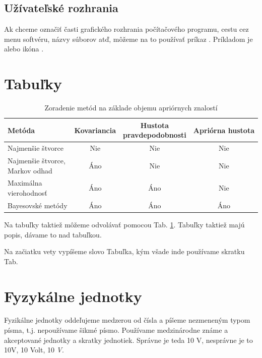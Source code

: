\subsection{Užívateľské rozhrania}

Ak chceme označiť časti grafického rozhrania počítačového programu, cestu cez menu softvéru, názvy súborov atď, môžeme na to používať príkaz . Príkladom je  alebo ikóna .

\section{Tabuľky}


\begin{table}[htb]
\centering
\caption{Zoradenie metód na základe objemu apriórnych znalostí}
\begin{tabular}{ |l|c|c|c| }
  \hline
  \parbox[c]{3.5cm}{Metóda} & Kovariancia & \parbox[c]{3cm}{Hustota\\pravdepodobnosti}& Apriórna hustota\\ [0.2cm] \hline
  \parbox[c]{3.5cm}{Najmenšie štvorce} & Nie & Nie & Nie \\ [0.2cm] \hline
  \parbox[c]{3.5cm}{Najmenšie štvorce,\\Markov odhad}& Áno & Nie & Nie \\ [0.2cm]   \hline
  \parbox[c]{3.5cm}{Maximálna\\vierohodnosť}& Áno & Áno & Nie \\ [0.2cm] \hline
  \parbox[c]{3.5cm}{Bayesovské metódy} & Áno & Áno & Áno \\ [0.2cm] \hline
\end{tabular}
    \label{TABULKA_3_1}
\end{table}

Na tabuľky taktiež môžeme odvolávať pomocou Tab. \ref{TABULKA_3_1}. Tabuľky taktiež majú popis, dávame to nad tabuľkou.

Na začiatku vety vypíšeme slovo Tabuľka, kým všade inde používame skratku Tab.

\section{Fyzykálne jednotky}

Fyzikálne jednotky oddeľujeme medzerou od čísla a píšeme nezmeneným typom písma, t.j. nepoužívame šikmé písmo. Používame medzinárodne známe a akceptované jednotky a skratky jednotiek. Správne je teda 10 V, nesprávne je to 10V, 10 Volt, 10 \emph{V}.


